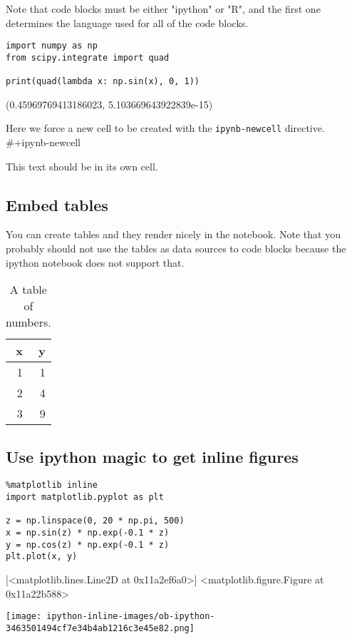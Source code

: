 \documentclass[11pt]{article}
\begin{document}
Note that code blocks must be either "ipython" or "R", and the first one determines the language used for all of the code blocks.

\begin{verbatim}
import numpy as np
from scipy.integrate import quad

print(quad(lambda x: np.sin(x), 0, 1))
\end{verbatim}

(0.45969769413186023, 5.103669643922839e-15)


Here we force a new cell to be created with the \texttt{ipynb-newcell} directive.
\#+ipynb-newcell

This text should be in its own cell.

\subsection{Embed tables}
\label{sec:orgd06a1ee}

You can create tables and they render nicely in the notebook. Note that you probably should not use the tables as data sources to code blocks because the ipython notebook does not support that.

\begin{table}[htbp]
\caption{A table of numbers.}
\centering
\begin{tabular}{rr}
x & y\\
\hline
1 & 1\\
2 & 4\\
3 & 9\\
\end{tabular}
\end{table}


\subsection{Use ipython magic to get inline figures}
\label{sec:org05718ab}

\begin{verbatim}
%matplotlib inline
import matplotlib.pyplot as plt

z = np.linspace(0, 20 * np.pi, 500)
x = np.sin(z) * np.exp(-0.1 * z)
y = np.cos(z) * np.exp(-0.1 * z)
plt.plot(x, y)
\end{verbatim}



[<matplotlib.lines.Line2D at 0x11a2ef6a0>]
<matplotlib.figure.Figure at 0x11a22b588>
\begin{center}
\texttt{[image: ipython-inline-images/ob-ipython-3463501494cf7e34b4ab1216c3e45e82.png]}
\end{center}
\end{document}
